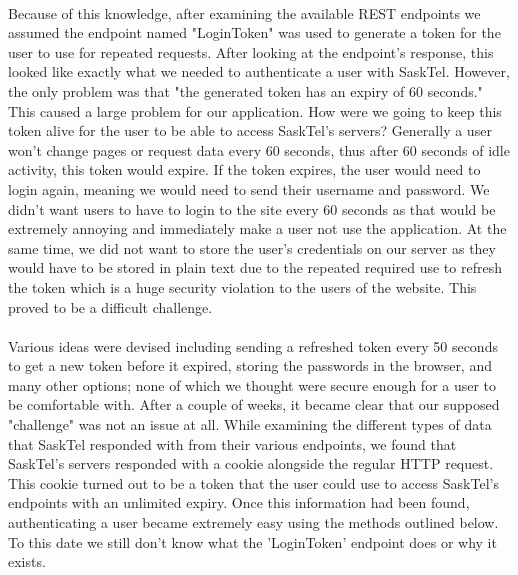 \documentclass[12pt]{article}
\begin{document}
\paragraph{}
	Because of this knowledge, after examining the available REST endpoints we assumed the endpoint named "LoginToken" was used to generate a token for the user to use for repeated requests. After looking at the endpoint's response, this looked like exactly what we needed to authenticate a user with SaskTel. However, the only problem was that "the generated token has an expiry of 60 seconds." This caused a large problem for our application. How were we going to keep this token alive for the user to be able to access SaskTel's servers? Generally a user won't change pages or request data every 60 seconds, thus after 60 seconds of idle activity, this token would expire. If the token expires, the user would need to login again, meaning we would need to send their username and password. We didn't want users to have to login to the site every 60 seconds as that would be extremely annoying and immediately make a user not use the application. At the same time, we did not want to store the user's credentials on our server as they would have to be stored in plain text due to the repeated required use to refresh the token which is a huge security violation to the users of the website. This proved to be a difficult challenge. 
\paragraph{}
	Various ideas were devised including sending a refreshed token every 50 seconds to get a new token before it expired, storing the passwords in the browser, and many other options; none of which we thought were secure enough for a user to be comfortable with. After a couple of weeks, it became clear that our supposed "challenge" was not an issue at all. While examining the different types of data that SaskTel responded with from their various endpoints, we found that SaskTel's servers responded with a cookie alongside the regular HTTP request. This cookie turned out to be a token that the user could use to access SaskTel's endpoints with an unlimited expiry. Once this information had been found, authenticating a user became extremely easy using the methods outlined below. To this date we still don't know what the 'LoginToken' endpoint does or why it exists.

\end{document}
